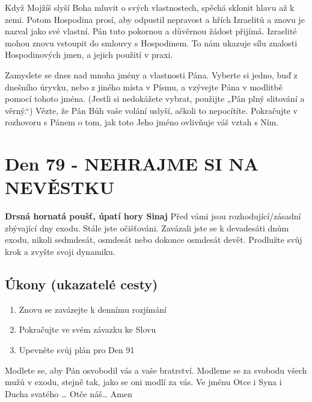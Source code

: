 \documentclass[11pt]{article}
\newcommand{\zacatekDvanactyTyden}{
\textbf{Drsná hornatá poušť, úpatí hory Sinaj} \newline 
Před vámi jsou rozhodující/zásadní zbývající dny exodu. Stále jste očišťováni. Zavázali jste se k devadesáti dnům exodu, nikoli sedmdesát, osmdesát nebo dokonce osmdesát devět. Prodlužte svůj krok a zvyšte svoji dynamiku.

\subsection*{Úkony (ukazatelé cesty)}
\begin{enumerate}
  \item Znovu se zavázejte k dennímu rozjímání
  \item Pokračujte ve svém závazku ke Slovu
  \item Upevněte svůj plán pro Den 91
\end{enumerate}
Modlete se, aby Pán osvobodil vás a vaše bratrství. \newline
Modleme se za svobodu všech mužů v exodu, stejně tak, jako se oni modlí za vás.\newline
Ve jménu Otce i Syna i Ducha svatého …  Otče náš… Amen
}
\begin{document}
Když Mojžíš slyší Boha mluvit o svých vlastnostech, spěchá sklonit hlavu až k zemi. Potom Hospodina prosí, aby
odpustil nepravost a hřích Izraelitů a znovu je nazval jako své vlastní. Pán tuto pokornou a důvěrnou žádost přijímá.
Izraelité mohou znovu vstoupit do smlouvy s Hospodinem. To nám ukazuje sílu znalosti Hospodinových jmen, a jejich
použití v praxi.

Zamyslete se dnes nad mnoha jmény a vlastnosti Pána. Vyberte si jedno, buď z dnešního úryvku, nebo z jiného místa
v Písmu, a vzývejte Pána v modlitbě pomocí tohoto jména. (Jestli si nedokážete vybrat, použijte „Pán plný slitování a
věrný.“) Vězte, že Pán Bůh vaše volání uslyší, ačkoli to nepocítíte. Pokračujte v rozhovoru s Pánem o tom, jak toto
Jeho jméno ovlivňuje váš vztah s Ním.


\newpage
\section{Den 79 - NEHRAJME SI NA NEVĚSTKU}
\zacatekDvanactyTyden
\end{document}
